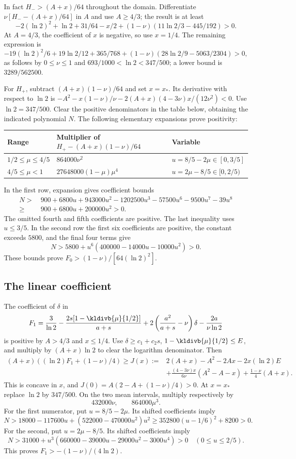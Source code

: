 In fact $H_->(A+x)/64$ throughout the domain. Differentiate $\nu[H_--(A+x)/64]$
in $A$ and use $A\ge4/3$; the result is at least
\[
 -2(\ln2)^2+\ln2+31/64-x/2
 +(1-\nu)(11\ln2/3-445/192)>0.
\]
At $A=4/3$, the coefficient of $x$ is negative, so use $x=1/4$. The remaining
expression is
\[
 -19(\ln2)^2/6+19\ln2/12+365/768
 +(1-\nu)(28\ln2/9-5063/2304)>0,
\]
as follows by $0\le\nu\le1$ and $693/1000<\ln2<347/500$; a lower bound is $3289/562500$.

For $H_+$, subtract $(A+x)(1-\nu)/64$ and set $x=x_*$. Its derivative with respect to $\ln2$ is
$-A^2-x(1-\nu)/\nu-2(A+x)(4-3\nu)x/(12\nu^2)<0$.
Use $\ln2=347/500$. Clear the positive denominators in the table below, obtaining
the indicated polynomial $N$. The following elementary expansions prove
positivity:
\begin{center}\small
\begin{tabular}{@{}lll@{}}\hline
Range & Multiplier of $H_+-(A+x)(1-\nu)/64$ & Variable\\\hline
$1/2\le\mu\le4/5$ & $864000\nu^2$ & $u=8/5-2\mu\in[0,3/5]$\\
$4/5\le\mu<1$ & $27648000(1-\mu)\mu^4$ & $u=2\mu-8/5\in[0,2/5)$\\\hline
\end{tabular}
\end{center}
In the first row, expansion gives coefficient bounds
\begin{align*}
 N>&\ 900+6800u+943000u^2-1202500u^3
       -57500u^6-9500u^7-39u^8\\
  \ge&\ 900+6800u+200000u^2>0.
\end{align*}
The omitted fourth and fifth coefficients are positive. The last inequality
uses $u\le3/5$. In the second row the first six coefficients are positive, the
constant exceeds $5800$, and the final four terms give
\[
 N>5800+u^6(400000-14000u-10000u^2)>0.
\]
These bounds prove $F_0>(1-\nu)/[64(\ln2)^2]$.

\subsection*{The linear coefficient}
The coefficient of $\delta$ in
\[
 F_1=\frac3{\ln2}-\frac{2s[1-\kldivb{\mu}{1/2}]}{a+s}
       +2\left(\frac{a^2}{a+s}-\nu\right)\delta-\frac{2a}{\nu\ln2}
\]
is positive by $A>4/3$ and $x\le1/4$. Use $\delta\ge c_1+c_2s$, $1-\kldivb{\mu}{1/2}\le E$, and
multiply by $(A+x)\ln2$ to clear the logarithm denominator. Then
\begin{align*}
 (A+x)((\ln2)F_1+(1-\nu)/4)\ge J(x):={}&2(A+x)-A^2-2Ax-2x(\ln2)E\\
 &+\frac{(4-3\nu)x}{6\nu}(A^2-A-x)+\frac{1-\nu}{4}(A+x).
\end{align*}
This is concave in $x$, and $J(0)=A(2-A+(1-\nu)/4)>0$. At $x=x_*$ replace $\ln2$ by
$347/500$. On the two mean intervals, multiply respectively by
\[
 432000\nu,\qquad 864000\mu^3.
\]
For the first numerator, put $u=8/5-2\mu$. Its shifted coefficients imply
\[
 N>18000-117600u+(522000-470000u^2)u^2
 \ge352800(u-1/6)^2+8200>0.
\]
For the second, put $u=2\mu-8/5$. Its shifted coefficients imply
\[
 N>31000+u^3(660000-39000u-29000u^2-3000u^4)>0
 \quad(0\le u\le2/5).
\]
This proves $F_1>-(1-\nu)/(4\ln2)$.

